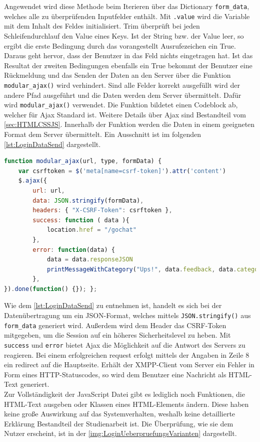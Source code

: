 \documentclass[a4paper,titlepage,halfparskip,12pt]{scrreprt}
\begin{document}
\begin{onehalfspacing}
Angewendet wird diese Methode beim Iterieren über das Dictionary \texttt{form\_data}, welches alle zu überprüfenden Inputfelder enthält. Mit \texttt{.value} wird die Variable mit dem Inhalt des Feldes initialisiert. Trim überprüft bei jeden Schleifendurchlauf den Value eines Keys. Ist der String bzw. der Value leer, so ergibt die erste Bedingung durch das vorangestellt Ausrufezeichen ein True. Daraus geht hervor, dass der Benutzer in das Feld nichts eingetragen hat. Ist das Resultat der zweiten Bedingungen ebenfalls ein True bekommt der Benutzer eine Rückmeldung und das Senden der Daten an den Server über die Funktion \texttt{modular\_ajax()} wird verhindert. Sind alle Felder korrekt ausgefüllt wird der andere Pfad ausgeführt und die Daten werden dem Server übermittelt. Dafür wird \texttt{modular\_ajax()} verwendet. Die Funktion bildetet einen Codeblock ab, welcher für Ajax Standard ist. Weitere Details über Ajax sind Bestandteil vom \autoref{sec:HTMLCSSJS}. Innerhalb der Funktion werden die Daten in einem geeigneten Format dem Server übermittelt. Ein Ausschnitt ist im folgenden \autoref{lst:LoginDataSend} dargestellt.
\begin{lstlisting}[language=Javascript,caption=Ausschnitt aus \texttt{modular\_ajax()},label={lst:LoginDataSend}]
function modular_ajax(url, type, formData) {
	var csrftoken = $('meta[name=csrf-token]').attr('content')
	$.ajax({
		url: url,
		data: JSON.stringify(formData),
		headers: { "X-CSRF-Token": csrftoken },
		success: function ( data ){
			location.href = "/gochat"
		},
		error: function(data) {
			data = data.responseJSON
			printMessageWithCategory("Ups!", data.feedback, data.category);
		}, 
}).done(function() {}); };
\end{lstlisting}
Wie dem \autoref{lst:LoginDataSend} zu entnehmen ist, handelt es sich bei der Datenübertragung um ein JSON-Format, welches mittels \texttt{JSON.stringify()} aus \texttt{form\_data} generiert wird. Außerdem wird dem Header das CSRF-Token mitgegeben, um die Session auf ein höheres Sicherheitslevel zu heben. Mit \texttt{success} und \texttt{error} bietet Ajax die Möglichkeit auf die Antwort des Servers zu reagieren. Bei einem erfolgreichen request erfolgt mittels der Angaben in Zeile 8 ein redirect auf die Hauptseite. Erhält der XMPP-Client vom Server ein Fehler in Form eines HTTP-Statuscodes, so wird dem Benutzer eine Nachricht als HTML-Text generiert.\cite{jQueryAjax}\\
Zur Vollständigkeit der JavaScript Datei gibt es lediglich noch Funktionen, die \ac{HTML}-Text ausgeben oder Klassen eines \ac{HTML}-Elements ändern. Diese haben keine große Auswirkung auf das Systemverhalten, weshalb keine detaillierte Erklärung Bestandteil der Studienarbeit ist. Die Überprüfung, wie sie dem Nutzer erscheint, ist in der \autoref{img:LoginUeberpruefungsVarianten} dargestellt.

\end{onehalfspacing}
\end{document}
